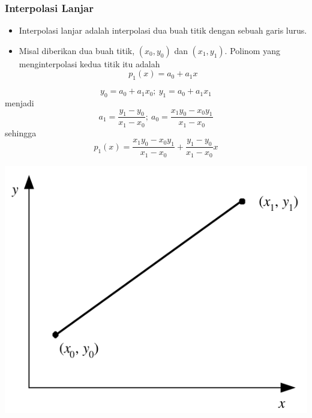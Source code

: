 \documentclass[pdflatex,compress,mathserif]{beamer}
\begin{document}
\begin{frame}
	\frametitle{Interpolasi Lanjar}
	\begin{itemize}
		\item Interpolasi lanjar adalah interpolasi dua buah titik dengan sebuah garis lurus.
		\item Misal diberikan dua buah titik, $ (x_0 , y_0) $ dan $ (x_1, y_1) $. Polinom yang menginterpolasi kedua titik itu adalah \[ p_1 (x) = a_0 + a_1 x \]
	\end{itemize}
	\begin{multicols}{2}
		\[ y_0 = a_0 + a_1 x_0;~y_1 = a_0 + a_1 x_1 \] menjadi
		\[ a_1 = \frac{y_1 - y_0}{x_1 - x_0};~a_0 = \frac{x_1 y_0 - x_0 y_1}{x_1 - x_0} \] sehingga
		\[ p_1(x) = \frac{x_1 y_0 - x_0 y_1}{x_1 - x_0} +  \frac{y_1 - y_0}{x_1 - x_0} x \]
		\columnbreak
		\begin{center}
			\includegraphics[width=0.8\linewidth]{img/img04}
		\end{center}
	\end{multicols}
\end{frame}
\end{document}
